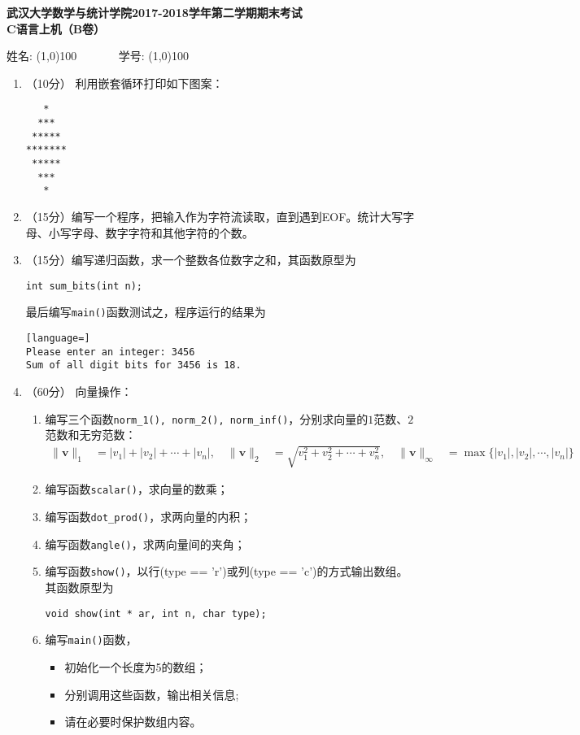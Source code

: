 \documentclass[8pt]{article}
\newcommand{\vv}{\boldsymbol v}
\newlength{\la}
\newlength{\ld}
\begin{document}
\begin{CJK}{UTF8}{gkai}
\begin{center}
{\Large \bf  武汉大学数学与统计学院2017-2018学年第二学期期末考试\\[0.1in]
  C语言上机（B卷）} \vspace{0.1in}

姓名: \line(1,0){100} ~~~~~~ 学号: \line(1,0){100}

\end{center}


\begin{enumerate} %
\item （10分） 利用嵌套循环打印如下图案：
\begin{lstlisting}
   *
  ***
 *****
*******
 *****
  ***
   *
\end{lstlisting}

\item （15分）编写一个程序，把输入作为字符流读取，直到遇到EOF。统计大写字母、小写字母、数字字符和其他字符的个数。

\item （15分）编写递归函数，求一个整数各位数字之和，其函数原型为
\begin{lstlisting}
int sum_bits(int n);
\end{lstlisting}
最后编写\lstinline|main()|函数测试之，程序运行的结果为
\begin{lstlisting}[language=]
Please enter an integer: 3456
Sum of all digit bits for 3456 is 18.  
\end{lstlisting}



\item （60分） 向量操作：
\begin{enumerate}
\item  编写三个函数\lstinline|norm_1(), norm_2(), norm_inf()|，分别求向量的$1$范数、$2$范数和无穷范数：
$$
\begin{aligned}
\|\vv\|_1 &= |v_1|+|v_2|+\cdots+|v_n|, \quad
\|\vv\|_2 &= \sqrt{v_1^2+v_2^2+\cdots+v_n^2}, \quad
\|\vv\|_\infty &= \max\{|v_1|,|v_2|,\cdots,|v_n|\}\ 
\end{aligned}
$$
\item 编写函数\lstinline|scalar()|，求向量的数乘；
\item 编写函数\lstinline|dot_prod()|，求两向量的内积；
\item 编写函数\lstinline|angle()|，求两向量间的夹角；
\item 编写函数\lstinline|show()|，以行(type == 'r')或列(type == 'c')的方式输出数组。其函数原型为
\begin{lstlisting}
void show(int * ar, int n, char type);
\end{lstlisting}
\item 编写\lstinline|main()|函数，
\begin{itemize}
	\item 初始化一个长度为5的数组；
	\item 分别调用这些函数，输出相关信息;
	\item 请在必要时保护数组内容。
\end{itemize}
\end{enumerate}



\end{enumerate}
\end{CJK}
\end{document}

